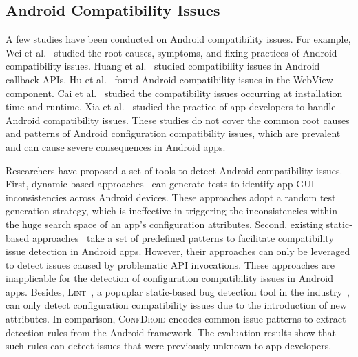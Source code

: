 \subsection{Android Compatibility Issues}
A few studies have been conducted on Android compatibility issues.
For example, Wei et al.~\cite{wei2016taming,wei2018understanding} studied the root causes, symptoms, and fixing
practices of Android compatibility issues.
Huang et al.~\cite{huang2018understanding} studied compatibility issues in Android callback APIs.
Hu et al.~\cite{hu2018tale} found Android compatibility issues in the WebView component.
Cai et al.~\cite{cai2019large} studied the compatibility issues occurring at
installation time and runtime.
Xia et al.~\cite{xiaandroid} studied the practice of app developers to
handle Android compatibility issues.
These studies do not cover the common root causes and patterns of Android
configuration compatibility issues, which are prevalent and can cause severe
consequences in Android apps.

Researchers have proposed a set of tools to detect Android compatibility issues.
First, dynamic-based approaches~\cite{fazzini2017automated,ki2019mimic} can
generate tests to identify app GUI inconsistencies across Android devices.
These approaches adopt a random test generation strategy, which is ineffective in triggering the inconsistencies within the huge search space of an
app's configuration attributes.
Second, existing static-based approaches~\cite{wei2016taming,wei2019pivot,huang2018understanding,li2018cid,li2018elegant,he2018understanding,wei2018understanding} take a set of predefined patterns to facilitate compatibility issue detection in Android apps.
However, their approaches can only be leveraged to detect issues caused by
problematic API invocations. These approaches are inapplicable for the detection
of configuration compatibility issues in Android apps.
Besides, \textsc{Lint}~\cite{lint}, a popuplar static-based bug detection tool
in the industry~\cite{wei2017oasis}, can only detect configuration compatibility
issues due to the introduction of new attributes.
In comparison, \textsc{ConfDroid} encodes common issue patterns to extract detection rules from the Android framework.
The evaluation results show that such rules can detect issues that were
previously unknown to app developers.

